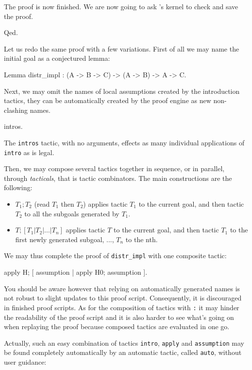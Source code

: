 \documentclass[11pt,a4paper]{book}
\begin{document}
The proof is now finished. We are now going to ask \Coq{}'s kernel
to check and save the proof.
\begin{coq_example}
Qed.
\end{coq_example}

Let us redo the same proof with a few variations. First of all we may name
the initial goal as a conjectured lemma:
\begin{coq_example}
Lemma distr_impl : (A -> B -> C) -> (A -> B) -> A -> C.
\end{coq_example}

Next, we may omit the names of local assumptions created by the introduction
tactics, they can be automatically created by the proof engine as new
non-clashing names.
\begin{coq_example}
intros.
\end{coq_example}

The \verb:intros: tactic, with no arguments, effects as many individual
applications of \verb:intro: as is legal.

Then, we may compose several tactics together in sequence, or in parallel,
through {\sl tacticals}, that is tactic combinators. The main constructions
are the following:
\begin{itemize}
\item $T_1 ; T_2$ (read $T_1$ then $T_2$) applies tactic $T_1$ to the current
goal, and then tactic $T_2$ to all the subgoals generated by $T_1$.
\item $T; [T_1 | T_2 | ... | T_n]$ applies tactic $T$ to the current
goal, and then tactic $T_1$ to the first newly generated subgoal, 
..., $T_n$ to the nth.
\end{itemize}

We may thus complete the proof of \verb:distr_impl: with one composite tactic:
\begin{coq_example}
apply H; [ assumption | apply H0; assumption ].
\end{coq_example}

You should be aware however that relying on automatically generated names is
not robust to slight updates to this proof script. Consequently, it is
discouraged in finished proof scripts. As for the composition of tactics with
\texttt{:} it may hinder the readability of the proof script and it is also
harder to see what's going on when replaying the proof because composed
tactics are evaluated in one go.

Actually, such an easy combination of tactics \verb:intro:, \verb:apply:
and \verb:assumption: may be found completely automatically by an automatic
tactic, called \verb:auto:, without user guidance:
\end{document}
